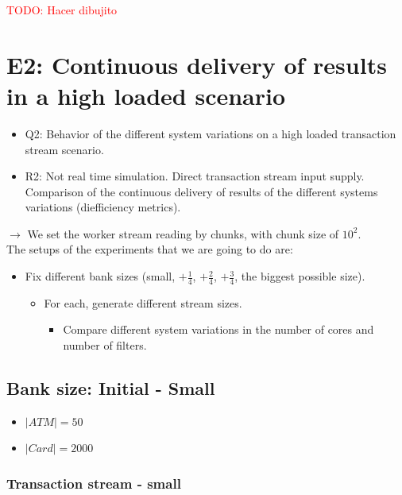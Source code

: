 \documentclass{article}
\begin{document}
\textcolor{red}{TODO: Hacer dibujito}

\section{E2: Continuous delivery of results in a high loaded scenario}

\begin{itemize}
  \item Q2: Behavior of the different system variations on a high loaded transaction stream scenario.
  \item R2: Not real time simulation. Direct transaction stream input supply. Comparison of the continuous delivery of results of the different systems variations (diefficiency metrics).
\end{itemize}

$\rightarrow$ We set the worker stream reading by chunks, with chunk size of $10^2$.\\

The setups of the experiments that we are going to do are:
\begin{itemize}
  \item Fix different bank sizes (small, $+\frac{1}{4}$, $+\frac{2}{4}$, $+\frac{3}{4}$, the biggest possible size).
  \begin{itemize}
    \item For each, generate different stream sizes.
    \begin{itemize}
      \item Compare different system variations in the number of cores and number of filters.
    \end{itemize}
  \end{itemize}
\end{itemize}

\subsection{Bank size: Initial - Small}

\begin{itemize}
  \item $|ATM| = 50$
  \item $|Card| = 2000$
\end{itemize}

\subsubsection{Transaction stream - small}
\end{document}

